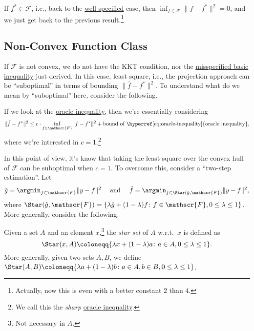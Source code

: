 \begin{remark}
	If \(f^{\ast} \in \mathscr{F} \), i.e., back to the \hyperref[def:well-specified]{well specified} case, then \(\inf _{f\in \mathscr{F} } \lVert f - f^{\ast} \rVert ^2 = 0\), and we just get back to the previous result.\footnote{Actually, now this is even with a better constant \(2\) than \(4\).}
\end{remark}

\subsection{Non-Convex Function Class}
If \(\mathscr{F} \) is not convex, we do not have the KKT condition, nor the \hyperref[eq:misspecified-convex-basic-inequality]{misspecified basic inequality} just derived. In this case, least square, i.e., the projection approach can be ``suboptimal'' in terms of bounding \(\lVert \hat{f} - f^{\ast} \rVert ^2\). To understand what do we mean by ``suboptimal'' here, consider the following.

\begin{intuition}
	If we look at the \hyperref[eq:oracle-inequality]{oracle inequality}, then we're essentially considering
	\[
		\lVert \hat{f} - f^{\ast}  \rVert ^2 \leq c \cdot \inf _{f\in \mathscr{F} } \lVert f - f^{\ast}  \rVert ^2 + \text{bound of \hyperref[eq:oracle-inequality]{oracle inequality}},
	\]
	where we're interested in \(c = 1\).\footnote{We call this the \emph{sharp} \hyperref[eq:oracle-inequality]{oracle inequality}.}
\end{intuition}

In this point of view, it's know that taking the least square over the convex hull of \(\mathscr{F} \) can be suboptimal when \(c = 1\). To overcome this, consider a ``two-step estimation''. Let
\[
	\hat{g} = \argmin_{f\in \mathscr{F} } \lVert y - f \rVert ^2
	\quad\text{ and }\quad
	\hat{f} = \argmin_{f\in \Star(\hat{g} , \mathscr{F} ) } \lVert y - f \rVert ^2,
\]
where \(\Star(\hat{g} , \mathscr{F} ) = \{ \lambda \hat{g} + (1 - \lambda ) f \colon f\in \mathscr{F} , 0 \leq \lambda \leq 1 \} \). More generally, consider the following.

\begin{definition}\label{def:star-set}
	Given a set \(A\) and an element \(x\),\footnote{Not necessary in \(A\).} the \emph{star set} of \(A\) w.r.t.\ \(x\) is defined as
	\[
		\Star(x, A) \coloneqq \{ \lambda x + (1 - \lambda ) a \colon a\in A , 0 \leq \lambda \leq 1 \}.
	\]
	More generally, given two sets \(A, B\), we define \(\Star(A, B) \coloneqq \{ \lambda a + (1 - \lambda ) b \colon a\in A , b\in B, 0 \leq \lambda \leq 1 \}\).
\end{definition}

